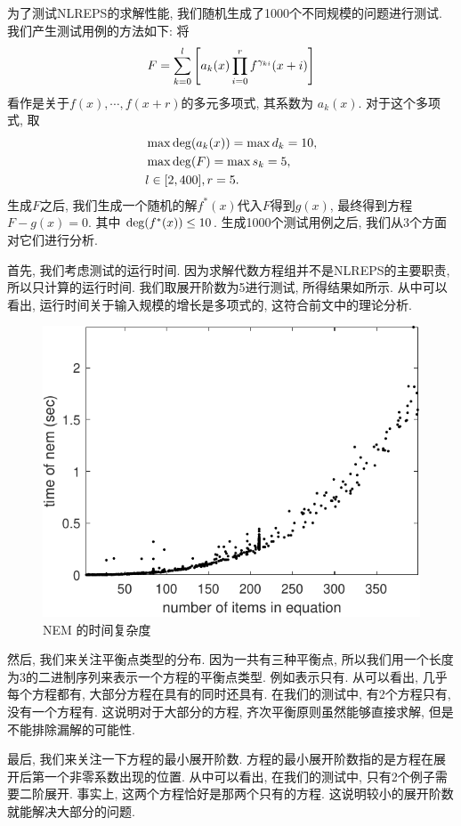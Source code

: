 为了测试NLREPS的求解性能, 我们随机生成了1000个不同规模的问题进行测试. 我们产生测试用例的方法如下: 将 
\begin{equation}
    F=\sum_{k=0}^l{\left[a_k(x)\prod_{i=0}^r{f^{\gamma_{ki}}(x+i)}\right]}
\end{equation}
看作是关于$f(x),\cdots,f(x+r)$的多元多项式, 其系数为 $a_k(x)$. 对于这个多项式, 取
\begin{equation}
\begin{aligned}
&\max{\rm deg}(a_k(x))=\max d_k=10,\\ 
&\max{\rm deg}(F)=\max s_k=5, \\
&l\in [2,400], r=5.
\end{aligned}
\end{equation}
生成$F$之后, 我们生成一个随机的解$f^*(x)$代入$F$得到$g(x)$, 最终得到方程$F-g(x)=0$. 其中 ${\rm deg}(f^*(x))\le 10$. 生成1000个测试用例之后, 我们从3个方面对它们进行分析. 

首先, 我们考虑测试的运行时间. 因为求解代数方程组并不是NLREPS的主要职责, 所以只计算的运行时间. 我们取展开阶数为5进行测试, 所得结果如所示. 从中可以看出, 运行时间关于输入规模的增长是多项式的, 这符合前文中的理论分析. 
\begin{figure}[htbp]
\centering
\includegraphics[width=.5\textwidth]{fig/t-nem.pdf}
\caption{NEM 的时间复杂度}
\label{t-nem}
\end{figure}

然后, 我们来关注平衡点类型的分布. 因为一共有三种平衡点, 所以我们用一个长度为3的二进制序列来表示一个方程的平衡点类型. 例如表示只有\BPone{}. 从可以看出, 几乎每个方程都有\BPone{}, 大部分方程在具有\BPone{}的同时还具有\BPthree{}. 在我们的测试中, 有2个方程只有\BPthree{}, 没有一个方程有\BPtwo{}. 这说明对于大部分的方程, 齐次平衡原则虽然能够直接求解, 但是不能排除漏解的可能性.


最后, 我们来关注一下方程的最小展开阶数. 方程的最小展开阶数指的是方程在展开后第一个非零系数出现的位置. 从中可以看出, 在我们的测试中, 只有2个例子需要二阶展开. 事实上, 这两个方程恰好是那两个只有\BPthree{}的方程. 这说明较小的展开阶数就能解决大部分的问题. 

